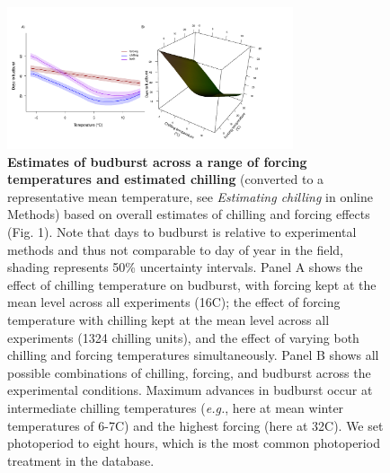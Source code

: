 \documentclass{article}
\begin{document}
\begin{figure}[h!]
\centering
\noindent \includegraphics[width=0.75\textwidth]{..//..//analyses/bb_analysis/figures/bbmod_2d3dplot_utah_withPEP.pdf}
\caption{\textbf{Estimates of budburst across a range of forcing temperatures and estimated chilling} (converted to a representative mean temperature, see \emph{Estimating chilling} in online Methods) based on overall estimates of chilling and forcing effects (Fig. 1).  Note that days to budburst is relative to experimental methods and thus not comparable to day of year in the field, shading represents 50\% uncertainty intervals. Panel A shows the effect of chilling temperature on budburst, with forcing kept at the mean level across all experiments (16\degree C);  the effect of forcing temperature with chilling kept at the mean level across all experiments (1324 chilling units), and  the effect of varying both chilling and forcing temperatures simultaneously. Panel B shows all possible combinations of chilling, forcing, and budburst across the experimental conditions.
Maximum advances in budburst occur at intermediate chilling temperatures (\emph{e.g.}, here at mean winter temperatures of 6-7\degree C) and the highest forcing (here at 32\degree C). We set photoperiod to eight hours, which is the most common photoperiod treatment in the database.}%
\label{fig:3dfieldchillutah}
\end{figure}
\end{document}
